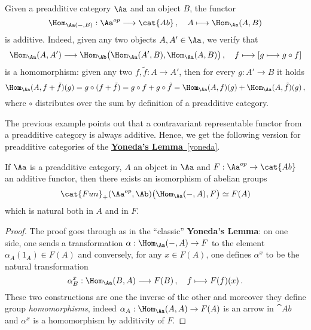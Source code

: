 \begin{ex}
    Given a preadditive category $\Aa$ and an object $B$,
    the functor
    \begin{equation*}
        \Hom_{\Aa(-,B)} : \Aa^{op} \longrightarrow \cat{Ab}\,,
        \quad A \longmapsto \Hom_{\Aa}(A,B)
    \end{equation*}
    is additive. Indeed, given any two objects $A,A' \in \Aa$,
    we verify that
    \begin{equation*}
        \Hom_{\Aa}(A,A') \longrightarrow 
        \Hom_{\Ab}\big(\Hom_{\Aa}(A',B),\Hom_{\Aa}(A,B)\big)\,,
        \quad
        f \longmapsto [g \longmapsto g \circ f]
    \end{equation*}
    is a homomorphism: given any two $f,\tilde{f} : A \to A'$,
    then for every $g : A' \to B$ it holds
    \begin{equation*}
        \Hom_{\Aa}(A,f+\tilde{f})(g) = g \circ (f+\tilde{f}) 
        = g \circ f + g \circ \tilde{f}
        = \Hom_{\Aa}(A,f)(g) + \Hom_{\Aa}(A,\tilde{f})(g)\,,
    \end{equation*}
    where $\circ$ distributes over the sum by definition
    of a preadditive category.
\end{ex}

The previous example points out that
a contravariant representable functor from a
preadditive category is always additive.
Hence, we get the following version
for preadditive categories
of the \hyperref[yoneda]{\textbf{Yoneda's Lemma}~\ref*{yoneda}}.

\begin{thm}\label{additive-yoneda}
    If $\Aa$ is a preadditive category,
    $A$ an object in $\Aa$ and $F : \Aa^{op} \to \cat{Ab}$
    an additive functor,
    then there exists an isomorphism of
    abelian groups
    \begin{equation*}
        \cat{Fun}_{+}(\Aa^{op},\Ab)\big(\Hom_{\Aa}(-,A),F\big) \simeq F(A)
    \end{equation*}
    which is natural both in $A$ and in $F$.
    \begin{proof}
        The proof goes through as in the ``classic''
        \textbf{Yoneda's Lemma}: on one side, one sends a
        transformation $\alpha : \Hom_{\Aa}(-,A) \to F$
        to the element $\alpha_{A}(1_{A}) \in F(A)$
        and conversely, for any $x \in F(A)$,
        one defines $\alpha^{x}$ to be the natural transformation
        \begin{equation*}
            \alpha_{B}^{x} : \Hom_{\Aa}(B,A) \longrightarrow F(B)\,,
            \quad f \longmapsto F(f)(x)\,.
        \end{equation*}
        These two constructions are one the inverse of the other
        and moreover they define group \emph{homomorphisms},
        indeed $\alpha_{A}: \Hom_{\Aa}(A,A) \to F(A)$ 
        is an arrow in $\cat{Ab}$
        and $\alpha^{x}$ is a homomorphism by additivity of $F$.
    \end{proof}
\end{thm}